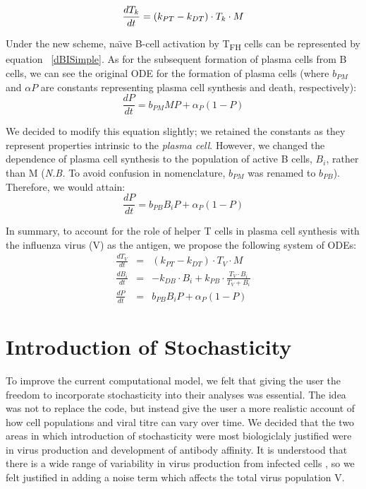\documentclass[a4paper, 12pt]{report}
\begin{document}
\begin{equation}
\frac{dT_k}{dt} = (k_{PT}-k_{DT}) \cdot T_k \cdot M \\
\end{equation}

Under the new scheme, na\"\i ve B-cell activation by T\textsubscript{FH} cells can be represented by equation ~\ref{dBISimple}. As for the subsequent formation of plasma cells from B cells, we can see the original ODE for the formation of plasma cells (where $b_{PM}$ and $\alpha{P}$ are constants representing plasma cell synthesis and death, respectively):
\begin{equation}
\frac{dP}{dt} = b_{PM}MP + \alpha_{P}(1 - P)
\end{equation}

We decided to modify this equation slightly; we retained the constants as they represent properties intrinsic to the \emph{plasma cell}. However, we changed the dependence of plasma cell synthesis to the population of active B cells, $B_{i}$, rather than M (\emph{N.B. }To avoid confusion in nomenclature, $b_{PM}$ was renamed to $b_{PB}$). Therefore, we would attain:
\begin{equation}
\frac{dP}{dt} = b_{PB}B_{i}P + \alpha_{P}(1 - P)
\end{equation}

In summary, to account for the role of helper T cells in plasma cell synthesis with the influenza virus (V) as the antigen, we propose the following system of ODEs:
\begin{eqnarray*}
\frac{dT_V}{dt} &=& (k_{PT}-k_{DT}) \cdot T_V \cdot M \\
\frac{dB_i}{dt} &=& -k_{DB} \cdot B_i + k_{PB} \cdot \frac{T_{V} \cdot B_{i}}{T_{V}+B_{i}} \\
\frac{dP}{dt} &=& b_{PB}B_{i}P + \alpha_{P}(1 - P)
\end{eqnarray*}

\section{Introduction of Stochasticity} %
To improve the current computational model, we felt that giving the user the freedom to incorporate stochasticity into their analyses was essential. The idea was not to replace the code, but instead give the user a more realistic account of how cell populations and viral titre can vary over time. We decided that the two areas in which introduction of stochasticity were most biologiclaly justified were in virus production and development of antibody affinity. It is understood that there is a wide range of variability in virus production from infected cells \cite{MitchellJanuary152011}, so we felt justified in adding a noise term which affects the total virus population V.
\end{document}
